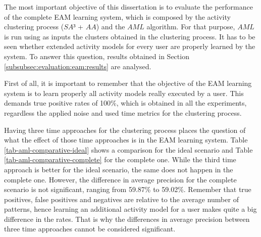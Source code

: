 The most important objective of this dissertation is to evaluate the performance of the complete EAM learning system, which is composed by the activity clustering process ($SA³$ + $AA$) and the $AML$ algorithm. For that purpose, $AML$ is run using as inputs the clusters obtained in the clustering process. It has to be seen whether extended activity models for every user are properly learned by the system. To answer this question, results obtained in Section \ref{subsubsec:evaluation:eam:results} are analysed.


First of all, it is important to remember that the objective of the EAM learning system is to learn properly all activity models really executed by a user. This demands true positive rates of 100\%, which is obtained in all the experiments, regardless the applied noise and used time metrics for the clustering process.  

Having three time approaches for the clustering process places the question of what the effect of those time approaches is in the EAM learning system. Table \ref{tab-aml-comparative-ideal} shows a comparison for the ideal scenario and Table \ref{tab-aml-comparative-complete} for the complete one. While the third time approach is better for the ideal scenario, the same does not happen in the complete one. However, the difference in average precision for the complete scenario is not significant, ranging from 59.87\% to 59.02\%. Remember that true positives, false positives and negatives are relative to the average number of patterns, hence learning an additional activity model for a user makes quite a big difference in the rates. That is why the differences in average precision between three time approaches cannot be considered significant. %

